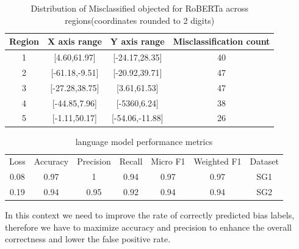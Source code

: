 \documentclass[11pt,a4paper]{article}
\begin{document}
\begin{table}[h]
\centering
\caption{Distribution of Misclassified objected for RoBERTa across regions(coordinates rounded to 2 digits)}
\label{tab:mscount}
\begin{adjustbox}{width=0.9\linewidth,center}
\begin{tabular}{cccc}
\hline
\multicolumn{1}{|c|}{\textbf{Region}} & \multicolumn{1}{l|}{\textbf{X axis range}} & \multicolumn{1}{l|}{\textbf{Y axis range}} & \multicolumn{1}{l|}{\textbf{Misclassification count}} \\ \hline
1                                     & {[}4.60,61.97{]}                           & {[}-24.17,28.35{]}                         & 40                                                    \\
2                                     & {[}-61.18,-9.51{]}                         & {[}-20.92,39.71{]}                         & 47                                                    \\
3                                     & {[}-27.28,38.75{]}                         & {[}3.61,61.53{]}                           & 47                                                    \\
4                                     & {[}-44.85,7.96{]}                          & {[}-5360,6.24{]}                           & 38                                                    \\
5                                     & {[}-1.11,50.17{]}                          & {[}-54.06,-11.88{]}                        & 26                                                   
\end{tabular}
\end{adjustbox}
\end{table}
\begin{table}[h]
\caption{language model performance metrics}
\centering
\begin{tabular}{ccccccc}
Loss & \multicolumn{1}{l}{Accuracy} & \multicolumn{1}{l}{Precision} & \multicolumn{1}{l}{Recall} & \multicolumn{1}{l}{Micro F1} & \multicolumn{1}{l}{Weighted F1} & \multicolumn{1}{l}{Dataset} \\
0.08 & 0.97                         & 1                             & 0.94                       & 0.97                         & 0.97                            & SG1                         \\
0.19 & 0.94                         & 0.95                          & 0.92                       & 0.94                         & 0.94                            & SG2                        
\end{tabular}
\end{table}
In this context we need to improve the rate of correctly predicted bias labels, therefore we have to maximize accuracy and precision to enhance the overall correctness and lower the false positive rate.\\
\end{document}
